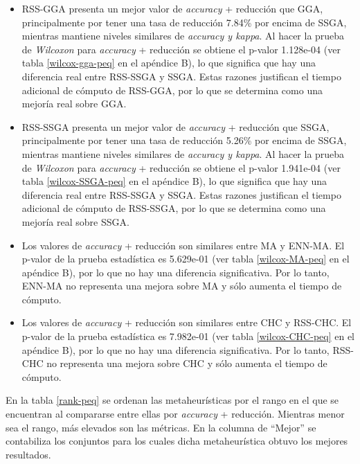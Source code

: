 \begin{itemize}
 
\item RSS-GGA presenta un mejor valor de \emph{accuracy} + reducción que GGA, principalmente por tener una tasa de reducción 7.84\% por encima de SSGA, mientras mantiene niveles similares de \emph{accuracy y kappa}. Al hacer la prueba de \emph{Wilcoxon} para \emph{accuracy} + reducción se obtiene el p-valor 1.128e-04 (ver tabla \ref{wilcox-gga-peq} en el apéndice B), lo que significa que hay una diferencia real entre RSS-SSGA y SSGA. Estas razones justifican el tiempo adicional de cómputo de RSS-GGA, por lo que se determina como una mejoría real sobre GGA.

\item RSS-SSGA presenta un mejor valor de \emph{accuracy} + reducción que SSGA, principalmente por tener una tasa de reducción 5.26\% por encima de SSGA, mientras mantiene niveles similares de \emph{accuracy y kappa}. Al hacer la prueba de \emph{Wilcoxon} para \emph{accuracy} + reducción se obtiene el p-valor 1.941e-04 (ver tabla \ref{wilcox-SSGA-peq} en el apéndice B), lo que significa que hay una diferencia real entre RSS-SSGA y SSGA. Estas razones justifican el tiempo adicional de cómputo de RSS-SSGA, por lo que se determina como una mejoría real sobre SSGA.

\item Los valores de \emph{accuracy} + reducción son similares entre MA y ENN-MA. El p-valor de la prueba estadística es 5.629e-01 (ver tabla \ref{wilcox-MA-peq} en el apéndice B), por lo que no hay una diferencia significativa. Por lo tanto, ENN-MA no representa una mejora sobre MA y sólo aumenta el tiempo de cómputo.

\item  Los valores de \emph{accuracy} + reducción son similares entre CHC y RSS-CHC. El p-valor de la prueba estadística es 7.982e-01 (ver tabla \ref{wilcox-CHC-peq} en el apéndice B), por lo que no hay una diferencia significativa. Por lo tanto, RSS-CHC no representa una mejora sobre CHC y sólo aumenta el tiempo de cómputo.

\end{itemize}

En la tabla \ref{rank-peq} se ordenan las metaheurísticas por el rango en el que se encuentran al compararse entre ellas por \emph{accuracy} + reducción. Mientras menor sea el rango, más elevados son las métricas. En la columna de ``Mejor'' se contabiliza los conjuntos para los cuales dicha metaheurística obtuvo los mejores resultados.

